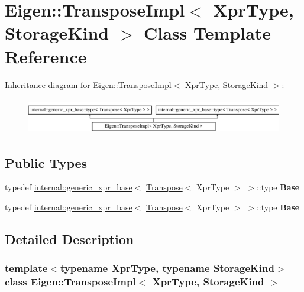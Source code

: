 \hypertarget{class_eigen_1_1_transpose_impl}{}\section{Eigen\+:\+:Transpose\+Impl$<$ Xpr\+Type, Storage\+Kind $>$ Class Template Reference}
\label{class_eigen_1_1_transpose_impl}
Inheritance diagram for Eigen\+:\+:Transpose\+Impl$<$ Xpr\+Type, Storage\+Kind $>$\+:\begin{figure}[H]
\begin{center}
\leavevmode
\includegraphics[height=1.573034cm]{class_eigen_1_1_transpose_impl}
\end{center}
\end{figure}
\subsection*{Public Types}
\begin{DoxyCompactItemize}
\item 
\mbox{\label{class_eigen_1_1_transpose_impl_ab0b1fd7b1095810ccaa0dd7ffb31e6ba}} 
typedef \hyperlink{struct_eigen_1_1internal_1_1generic__xpr__base}{internal\+::generic\+\_\+xpr\+\_\+base}$<$ \hyperlink{group___core___module_class_eigen_1_1_transpose}{Transpose}$<$ Xpr\+Type $>$ $>$\+::type {\bfseries Base}
\item 
\mbox{\label{class_eigen_1_1_transpose_impl_ab0b1fd7b1095810ccaa0dd7ffb31e6ba}} 
typedef \hyperlink{struct_eigen_1_1internal_1_1generic__xpr__base}{internal\+::generic\+\_\+xpr\+\_\+base}$<$ \hyperlink{group___core___module_class_eigen_1_1_transpose}{Transpose}$<$ Xpr\+Type $>$ $>$\+::type {\bfseries Base}
\end{DoxyCompactItemize}


\subsection{Detailed Description}
\subsubsection*{template$<$typename Xpr\+Type, typename Storage\+Kind$>$\newline
class Eigen\+::\+Transpose\+Impl$<$ Xpr\+Type, Storage\+Kind $>$}



